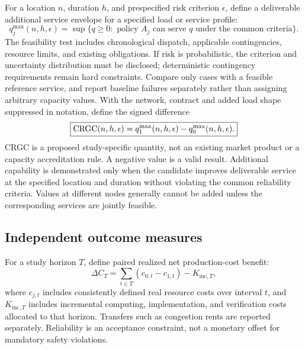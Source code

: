 \documentclass[11pt,letterpaper]{article}
\begin{document}
For a location $n$, duration $h$, and prespecified risk criterion $\epsilon$, define a deliverable additional service envelope for a specified load or service profile:
\begin{equation}
q^{\mathrm{max}}_j(n,h,\epsilon)=\sup\{q\geq0:\text{ policy }A_j\text{ can serve }q
\text{ under the common criteria}\}.
\end{equation}
The feasibility test includes chronological dispatch, applicable contingencies, resource limits, and existing obligations. If risk is probabilistic, the criterion and uncertainty distribution must be disclosed; deterministic contingency requirements remain hard constraints. Compare only cases with a feasible reference service, and report baseline failures separately rather than assigning arbitrary capacity values. With the network, contract and added load shape suppressed in notation, define the signed difference
\begin{equation}
\boxed{\operatorname{CRGC}(n,h,\epsilon)=q^{\mathrm{max}}_1(n,h,\epsilon)-q^{\mathrm{max}}_0(n,h,\epsilon).}
\label{eq:crgc_nodal}
\end{equation}
CRGC is a proposed study-specific quantity, not an existing market product or a capacity accreditation rule. A negative value is a valid result. Additional capability is demonstrated only when the candidate improves deliverable service at the specified location and duration without violating the common reliability criteria. Values at different nodes generally cannot be added unless the corresponding services are jointly feasible.

\subsection{Independent outcome measures}
For a study horizon $T$, define paired realized net production-cost benefit:
\begin{equation}
\Delta C_T=\sum_{t\in T}(c_{0,t}-c_{1,t})-K_{\mathrm{inc},T},
\end{equation}
where $c_{j,t}$ includes consistently defined real resource costs over interval $t$, and $K_{\mathrm{inc},T}$ includes incremental computing, implementation, and verification costs allocated to that horizon. Transfers such as congestion rents are reported separately. Reliability is an acceptance constraint, not a monetary offset for mandatory safety violations.
\end{document}
